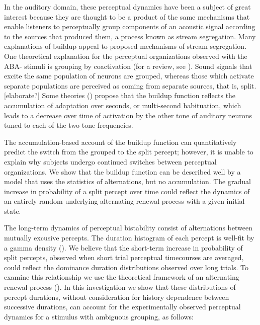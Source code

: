 \documentclass{frontiersSCNS} %
\begin{document}
In the auditory domain, these perceptual dynamics have been a subject of great interest because they are thought to be a product of the same mechanisms that enable listeners to perceptually group components of an acoustic signal according to the sources that produced them, a process known as stream segregation. Many explanations of buildup appeal to proposed mechanisms of stream segregation. One theoretical explanation for the perceptual organizations observed with the ABA- stimuli is grouping by coactivation (for a review, see \cite{Carlyon2004}). Sound signals that excite the same population of neurons are grouped, whereas those which activate separate populations are perceived as coming from separate sources, that is, split. [elaborate?] Some theories (\cite{Micheyl2005,Pressnitzer2008,Bee2010}) propose that the buildup function reflects the accumulation of adaptation over seconds, or multi-second habituation, which leads to a decrease over time of activation by the other tone of auditory neurons tuned to each of the two tone frequencies.  %

The accumulation-based account of the buildup function can quantitatively predict the switch from the grouped to the split percept; however, it is unable to explain why subjects undergo continued switches between perceptual organizations. We show that the buildup function can be described well by a model that uses the statistics of alternations, but no accumulation. The gradual increase in probability of a split percept over time could reflect the dynamics of an entirely random underlying alternating renewal process with a given initial state.

The long-term dynamics of perceptual bistability consist of alternations between mutually excusive percepts. The duration histogram of each percept is well-fit by a gamma density (\cite{Shpiro2009, Pressnitzer2006}). We believe that the short-term increase in probability of split percepts, observed when short trial perceptual timecourses are averaged, could reflect the dominance duration distributions observed over long trials. To examine this relationship we use the theoretical framework of an alternating renewal process (\cite{}). In this investigation we show that these distributions of percept durations, without consideration for history dependence between successive durations, can account for the experimentally observed perceptual dynamics for a stimulus with ambiguous grouping, as follows:
\end{document}
